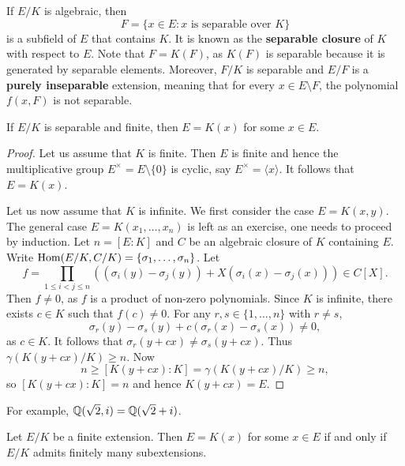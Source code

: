 \chapter{}

\label{separable}
If $E/K$ is algebraic, then 
\[
    F=\{x\in E:x\text{ is separable over }K\}
\]
is a subfield of $E$ that contains $K$. It is known as 
the \textbf{separable closure} of $K$ with respect to $E$. 
Note that $F=K(F)$, as
$K(F)$ is separable because it is generated by separable elements. Moreover, 
$F/K$ is separable and 
$E/F$ is a \textbf{purely inseparable} extension, meaning that
for every $x\in E\setminus F$, the polynomial $f(x,F)$ is not separable. 

\begin{proposition}
\label{pro:monogenic}
    If $E/K$ is separable and finite, then $E=K(x)$ for some $x\in E$. 
\end{proposition}

\begin{proof}
    Let us assume that $K$ is finite. Then $E$ is finite and hence 
    the multiplicative group $E^{\times}=E\setminus\{0\}$ 
    is cyclic, say $E^{\times}=\langle x\rangle$. It follows
    that $E=K(x)$. 
    
    Let us now assume that $K$ is infinite. We first consider the case 
    $E=K(x,y)$. The general case $E=K(x_1,\dots,x_n)$ is left as an exercise, one needs to proceed by induction. 
    Let $n=[E:K]$ and 
    $C$ be an algebraic closure of $K$ containing $E$. 
    Write $\operatorname{Hom}(E/K,C/K)=\{\sigma_1,\dots,\sigma_n\}$. Let 
    \[
    f=\prod_{1\leq i<j\leq n}\left((\sigma_i(y)-\sigma_j(y))
    +X(\sigma_i(x)-\sigma_j(x))\right)\in C[X].
    \]
    Then $f\ne 0$, as $f$ is a product of non-zero polynomials. Since $K$ is infinite, 
    there exists $c\in K$ such that $f(c)\ne 0$. For any $r,s\in\{1,\dots,n\}$ with 
    $r\ne s$,
    \[
        \sigma_r(y)-\sigma_s(y)+c(\sigma_r(x)-\sigma_s(x))\ne 0,
    \]
    as $c\in K$. It follows that $\sigma_r(y+cx)\ne\sigma_s(y+cx)$. Thus $\gamma(K(y+cx)/K)\geq n$. 
    Now 
    \[
    n\geq [K(y+cx):K]=\gamma(K(y+cx)/K)\geq n,
    \]
    so $[K(y+cx):K]=n$ and
    hence $K(y+cx)=E$. 
\end{proof}

For example, $\mathbb{Q}(\sqrt{2},i)=\mathbb{Q}(\sqrt{2}+i)$. 

\begin{proposition}
    Let $E/K$ be a finite extension. Then $E=K(x)$ for some $x\in E$ 
    if and only if $E/K$ admits finitely many subextensions. 
\end{proposition}

